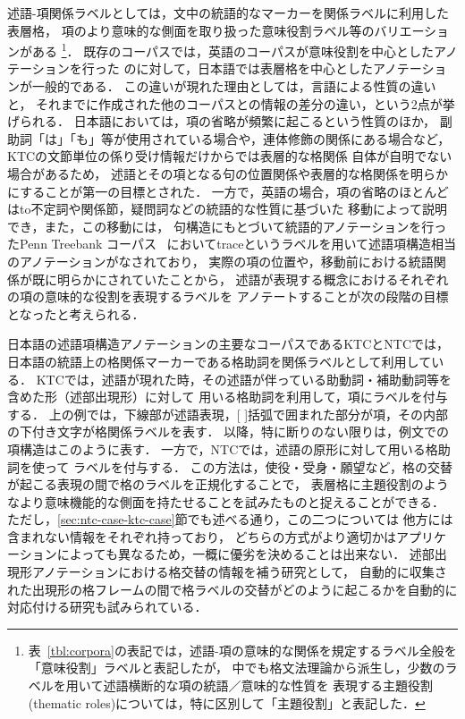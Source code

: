 \documentclass[japanese]{jnlp_1.4}
\begin{document}
述語-項関係ラベルとしては，文中の統語的なマーカーを関係ラベルに利用した表層格，
項のより意味的な側面を取り扱った意味役割ラベル等のバリエーションがある
\footnote{
表~\ref{tbl:corpora}の表記では，述語-項の意味的な関係を規定するラベル全般を「意味役割」ラベルと表記したが，
中でも格文法理論から派生し，少数のラベルを用いて述語横断的な項の統語／意味的な性質を
表現する主題役割(thematic roles)については，特に区別して「主題役割」と表記した．}．
既存のコーパスでは，英語のコーパスが意味役割を中心としたアノテーションを行った
のに対して，日本語では表層格を中心としたアノテーションが一般的である．
この違いが現れた理由としては，言語による性質の違いと，
それまでに作成された他のコーパスとの情報の差分の違い，という2点が挙げられる．
日本語においては，項の省略が頻繁に起こるという性質のほか，
副助詞「は」「も」等が使用されている場合や，連体修飾の関係にある場合など，KTCの文節単位の係り受け情報だけからでは表層的な格関係
自体が自明でない場合があるため，
述語とその項となる句の位置関係や表層的な格関係を明らかにすることが第一の目標とされた．
一方で，英語の場合，項の省略のほとんどはto不定詞や関係節，疑問詞などの統語的な性質に基づいた
移動によって説明でき，また，この移動には，
句構造にもとづいて統語的アノテーションを行ったPenn Treebank
コーパス~\cite{marcus1993building,marcus1994penn}
においてtraceというラベルを用いて述語項構造相当のアノテーションがなされており，
実際の項の位置や，移動前における統語関係が既に明らかにされていたことから，
述語が表現する概念におけるそれぞれの項の意味的な役割を表現するラベルを
アノテートすることが次の段階の目標となったと考えられる．

日本語の述語項構造アノテーションの主要なコーパスであるKTCとNTCでは，
日本語の統語上の格関係マーカーである格助詞を関係ラベルとして利用している．
KTCでは，述語が現れた時，その述語が伴っている助動詞・補助動詞等を含めた形（述部出現形）に対して
用いる格助詞を利用して，項にラベルを付与する．
上の例では，下線部が述語表現，[ ]括弧で囲まれた部分が項，その内部の下付き文字が格関係ラベルを表す．
以降，特に断りのない限りは，例文での項構造はこのように表す．
一方で，NTCでは，述語の原形に対して用いる格助詞を使って
ラベルを付与する．
この方法は，使役・受身・願望など，格の交替が起こる表現の間で格のラベルを正規化することで，
表層格に主題役割のようなより意味機能的な側面を持たせることを試みたものと捉えることができる．
ただし，\ref{sec:ntc-case-ktc-case}節でも述べる通り，この二つについては
他方には含まれない情報をそれぞれ持っており，
どちらの方式がより適切かはアプリケーションによっても異なるため，一概に優劣を決めることは出来ない．
述部出現形アノテーションにおける格交替の情報を補う研究として，
自動的に収集された出現形の格フレームの間で格ラベルの交替がどのように起こるかを自動的に対応付ける研究\cite{sasano2013}も試みられている．
\end{document}
